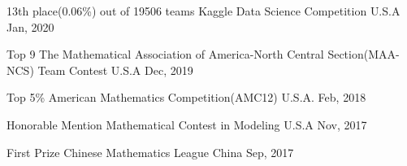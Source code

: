 



\begin{cvhonors}

\cvhonor
    {13th place(0.06\%) out of 19506 teams} %
    {Kaggle Data Science Competition} %
    {U.S.A} %
    {Jan, 2020} %

  \cvhonor
    {Top 9} %
    {The Mathematical Association of America-North Central Section(MAA-NCS) Team Contest} %
    {U.S.A} %
    {Dec, 2019} %

  \cvhonor
    {Top 5\%} %
    {American Mathematics Competition(AMC12)} %
    {U.S.A.} %
    {Feb, 2018} %

  \cvhonor
    {Honorable Mention} %
    {Mathematical Contest in Modeling} %
    {U.S.A} %
    {Nov, 2017} %

  \cvhonor
    {First Prize} %
    {Chinese Mathematics League} %
    {China} %
    {Sep, 2017} %

\end{cvhonors}



